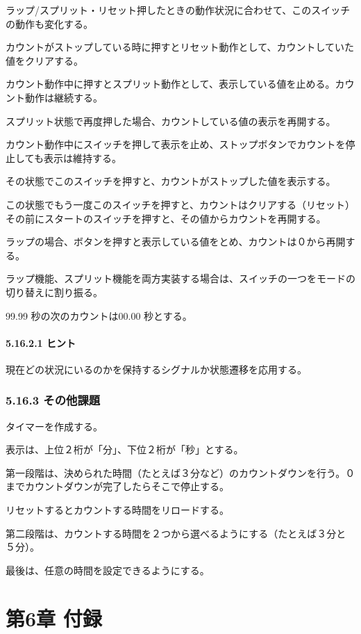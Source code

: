 \documentclass[letterpaper,10pt,dvipdfmx]{sphinxmanual}
\begin{document}
ラップ/スプリット・リセット押したときの動作状況に合わせて、このスイッチの動作も変化する。

カウントがストップしている時に押すとリセット動作として、カウントしていた値をクリアする。

カウント動作中に押すとスプリット動作として、表示している値を止める。カウント動作は継続する。

スプリット状態で再度押した場合、カウントしている値の表示を再開する。

カウント動作中にスイッチを押して表示を止め、ストップボタンでカウントを停止しても表示は維持する。

その状態でこのスイッチを押すと、カウントがストップした値を表示する。

この状態でもう一度このスイッチを押すと、カウントはクリアする（リセット）その前にスタートのスイッチを押すと、その値からカウントを再開する。

ラップの場合、ボタンを押すと表示している値をとめ、カウントは０から再開する。

ラップ機能、スプリット機能を両方実装する場合は、スイッチの一つをモードの切り替えに割り振る。

99.99 秒の次のカウントは00.00 秒とする。


\subsubsection{5.16.2.1 ヒント}
\label{05_try:id29}
現在どの状況にいるのかを保持するシグナルか状態遷移を応用する。


\subsection{5.16.3 その他課題}
\label{05_try:id30}
タイマーを作成する。

表示は、上位２桁が「分」、下位２桁が「秒」とする。

第一段階は、決められた時間（たとえば３分など）のカウントダウンを行う。０までカウントダウンが完了したらそこで停止する。

リセットするとカウントする時間をリロードする。

第二段階は、カウントする時間を２つから選べるようにする（たとえば３分と５分）。

最後は、任意の時間を設定できるようにする。


\chapter{第6章 付録}
\label{06_appendix:id1}\label{06_appendix::doc}
\end{document}

